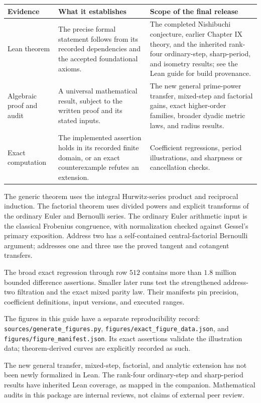 \begin{center}
\begin{tabular}{p{.23\linewidth}p{.34\linewidth}p{.34\linewidth}}
\toprule
Evidence & What it establishes & Scope of the final release \\
\midrule
Lean theorem & The precise formal statement follows from its recorded
dependencies and the accepted foundational axioms. & The completed Nishibuchi
conjecture, earlier Chapter IX theory, and the inherited rank-four ordinary-step,
sharp-period, and isometry results; see the Lean guide for build provenance. \\
\addlinespace
Algebraic proof and audit & A universal mathematical result, subject to the
written proof and its stated inputs. & The new general prime-power transfer,
mixed-step and factorial gains, exact higher-order families, broader dyadic
metric laws, and radius results. \\
\addlinespace
Exact computation & The implemented assertion holds in its recorded finite
domain, or an exact counterexample refutes an extension. & Coefficient
regressions, period illustrations, and sharpness or cancellation checks. \\
\bottomrule
\end{tabular}
\end{center}

The generic theorem uses the integral Hurwitz-series product and reciprocal
induction. The factorial theorem uses divided powers and explicit transforms
of the ordinary Euler and Bernoulli series. The ordinary Euler arithmetic
input is the classical Frobenius congruence, with normalization checked against
Gessel's primary exposition. Address two has a self-contained central-factorial
Bernoulli argument; addresses one and three use the proved tangent and
cotangent transfers.

The broad exact regression through row $512$ contains more than $1.8$ million
bounded difference assertions. Smaller later runs test the strengthened
address-two filtration and the exact mixed parity law. Their manifests pin
precision, coefficient definitions, input versions, and executed ranges.

The figures in this guide have a separate reproducibility record:
\texttt{sources/generate\_figures.py},
\texttt{figures/exact\_figure\_data.json}, and
\texttt{figures/figure\_manifest.json}. Its exact assertions validate the
illustration data; theorem-derived curves are explicitly recorded as such.

The new general transfer, mixed-step, factorial, and analytic extension has
not been newly formalized in Lean. The rank-four ordinary-step and sharp-period
results have inherited Lean coverage, as mapped in the companion. Mathematical audits
in this package are internal reviews, not claims of external peer review.

